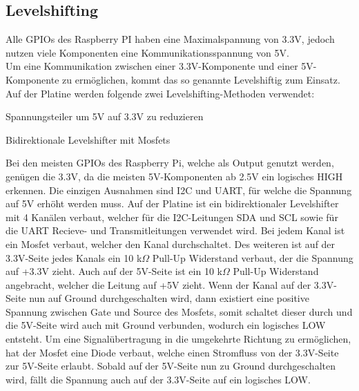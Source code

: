 \documentclass[12pt]{article}
\begin{document}
\subsection{Levelshifting}
Alle GPIOs des Raspberry PI haben eine Maximalspannung von 3.3V, jedoch nutzen viele Komponenten eine Kommunikationsspannung von 5V.\\
Um eine Kommunikation zwischen einer 3.3V-Komponente und einer 5V-Komponente zu ermöglichen, kommt das so genannte Levelshiftig zum Einsatz. Auf der Platine werden folgende zwei Levelshifting-Methoden verwendet:
\vspace{2mm}
\begin{compactitem}
    \item Spannungsteiler um 5V auf 3.3V zu reduzieren
    \item Bidirektionale Levelshifter mit Mosfets
\end{compactitem}
\vspace{6mm}
Bei den meisten GPIOs des Raspberry Pi, welche als Output genutzt werden, genügen die 3.3V, da die meisten 5V-Komponenten ab 2.5V ein logisches HIGH erkennen. Die einzigen Ausnahmen sind I2C und UART, für welche die Spannung auf 5V erhöht werden muss. Auf der Platine ist ein bidirektionaler Levelshifter mit 4 Kanälen verbaut, welcher für die I2C-Leitungen SDA und SCL sowie für die UART Recieve- und Transmitleitungen verwendet wird. Bei jedem Kanal ist ein Mosfet verbaut, welcher den Kanal durchschaltet. Des weiteren ist auf der 3.3V-Seite jedes Kanals ein 10 k$\Omega$ Pull-Up Widerstand verbaut, der die Spannung auf +3.3V zieht. Auch auf der 5V-Seite ist ein 10 k$\Omega$ Pull-Up Widerstand angebracht, welcher die Leitung auf +5V zieht. Wenn der Kanal auf der 3.3V-Seite nun auf Ground durchgeschalten wird, dann existiert eine positive Spannung zwischen Gate und Source des Mosfets, somit schaltet dieser durch und die 5V-Seite wird auch mit Ground verbunden, wodurch ein logisches LOW entsteht. Um eine Signalübertragung in die umgekehrte Richtung zu ermöglichen, hat der Mosfet eine Diode verbaut, welche einen Stromfluss von der 3.3V-Seite zur 5V-Seite erlaubt. Sobald auf der 5V-Seite nun zu Ground durchgeschalten wird, fällt die Spannung auch auf der 3.3V-Seite auf ein logisches LOW.
\end{document}
